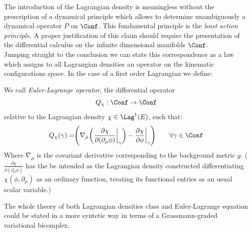 \documentclass[Main]{subfiles}
\begin{document}
	\vspace{2mm}
	The introduction of the Lagrangian density is meaningless without the prescription of a dynamical principle which allows to determine unambiguously a dynamical operator $P$ on $\Conf$.
	This fundamental principle is the \emph{least action principle}.
	A proper justification of this claim should require the presentation of the differential calculus on the infinite dimensional manifolds $\Conf$. 
	\\
	Jumping straight to the conclusion we can state this correspondence as a law which assigns to all Lagrangian densities an operator on the kinematic configurations space. In the case of a first order Lagrangian we define:
	\begin{definition}
	We call \emph{Euler-Lagrange operator}, the  differential operator
		\begin{displaymath}
			Q_\chi : \Conf \rightarrow \Conf
		\end{displaymath}
		relative to the Lagrangian density $\chi \in \Lag^1(E)$, such that:
		\begin{equation}
			Q_\chi (\gamma) = \Biggr( \nabla_\mu \biggr( \frac{\partial \chi}{\partial(\partial_\mu \phi)} \biggr\vert_\gamma \biggr) - \frac{\partial \chi}{\partial \phi}\biggr\vert_\gamma \Biggr) \qquad \forall \gamma \in \Conf
		\end{equation}
		Where $\nabla_\mu$ is the covariant derivative corresponding to the background metric $g$.
		($\frac{\partial \chi}{\partial(\partial_\mu \phi)}$ has the be intended as the Lagrangian density constructed differentiating $\chi(\phi, \partial_\mu)$ as an ordinary function, treating its functional entries as an usual scalar variable.)
	\end{definition}

	\begin{remark}	
		The whole theory of both Lagrangian densities class and Euler-Lagrange equation could be stated in a more syntetic way in terms of a Grassmann-graded variational bicomplex.\cite{Giachetta2009}\cite{Sardanashvily}
	\end{remark}
	
		

\end{document}
